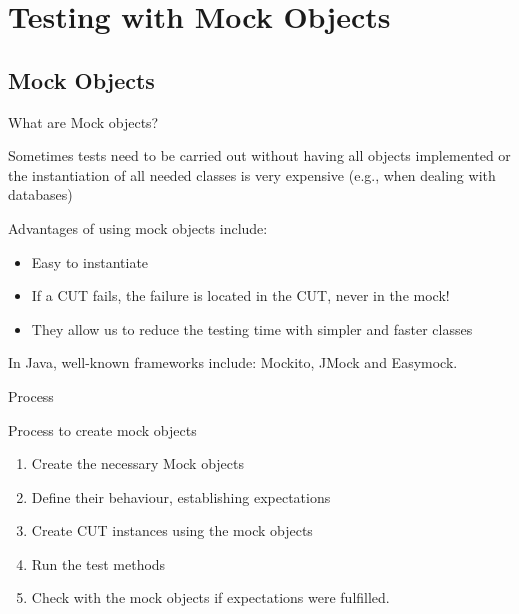 \documentclass[11pt, xcolor=svgnames]{beamer}
\begin{document}


\section{Testing with Mock Objects}


\subsection{Mock Objects}


\begin{frame}{What are Mock objects?}


Sometimes tests need to be carried out without having all objects implemented or the instantiation of all needed classes is very expensive (e.g., when dealing with databases)

Advantages of using mock objects include:

\begin{itemize}
 \item Easy to instantiate
 \item If a CUT fails, the failure is located in the CUT, never in the mock!
 \item They allow us to reduce the testing time with simpler and faster classes
\end{itemize}

In Java, well-known frameworks include: Mockito, JMock and Easymock.

\end{frame}


\begin{frame}{Process}

Process to create mock objects

\begin{enumerate}
 \item Create the necessary Mock objects
 \item Define their behaviour, establishing expectations
 \item Create CUT instances using the mock objects
 \item Run the test methods 
 \item Check with the mock objects if expectations were fulfilled. 
\end{enumerate}

\end{frame}
\end{document}
